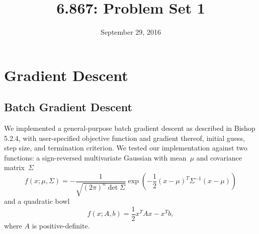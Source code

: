 \documentclass{amsart}
\title{6.867: Problem Set 1}
\date{September 29, 2016}
\begin{document}

\maketitle





\section{Gradient Descent}

\subsection{Batch Gradient Descent}

We implemented a general-purpose batch gradient descent as described in Bishop 5.2.4, with user-specified objective function and gradient thereof, initial guess, step size, and termination criterion. %
We tested our implementation against two functions: a sign-reversed multivariate Gaussian with mean~$\mu$ and covariance matrix~$\Sigma$
\begin{equation}
f(x; \mu, \Sigma) = -\frac{1}{\sqrt{(2\pi)^n \det\Sigma}}\exp\left( -\frac12(x - \mu)^T \Sigma^{-1}(x - \mu) \right)
\end{equation}
and a quadratic bowl
\begin{equation}
f(x; A, b) = \frac{1}{2}x^T Ax - x^T b,
\end{equation}
where $A$ is positive-definite.


\end{document}
